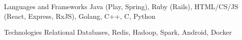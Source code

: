 
\begin{cvskills}
  \cvskill
    {Languages and Frameworks} %
    {Java (Play, Spring), Ruby (Rails), HTML/CS/JS (React, Express, RxJS), Golang, C++, C, Python } %

  \cvskill
    {Technologies} %
    {Relational Databases, Redis, Hadoop, Spark, Android, Docker} %
\end{cvskills}
